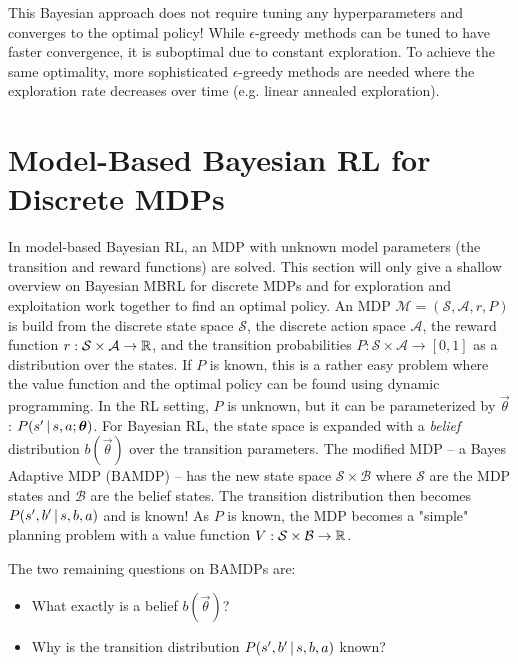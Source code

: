 			This Bayesian approach does not require tuning any hyperparameters and converges to the optimal policy! While \(\epsilon\)-greedy methods can be tuned to have faster convergence, it is suboptimal due to constant exploration. To achieve the same optimality, more sophisticated \(\epsilon\)-greedy methods are needed where the exploration rate decreases over time (e.g. linear annealed exploration).

	\section{Model-Based Bayesian RL for Discrete MDPs}
		In model-based Bayesian RL, an MDP with unknown model parameters (the transition and reward functions) are solved. This section will only give a shallow overview on Bayesian MBRL for discrete MDPs and for exploration and exploitation work together to find an optimal policy. An MDP \( \mathcal{M} = (\mathcal{S}, \mathcal{A}, r, P) \) is build from the discrete state space \(\mathcal{S}\), the discrete action space \(\mathcal{A}\), the reward function \( r : \mathcal{S} \times \mathcal{A} \to \mathbb{R} \), and the transition probabilities \( P : \mathcal{S} \times \mathcal{A} \to [0, 1] \) as a distribution over the states. If \(P\) is known, this is a rather easy problem where the value function and the optimal policy can be found using dynamic programming. In the RL setting, \(P\) is unknown, but it can be parameterized by \(\vec{\theta}\): \( P(s' \,\vert\, s, a; \bm{\theta}) \). For Bayesian RL, the state space is expanded with a \emph{belief} distribution \( b(\vec{\theta}) \) over the transition parameters. The modified MDP -- a Bayes Adaptive MDP (BAMDP) -- has the new state space \( \mathcal{S} \times \mathcal{B} \) where \(\mathcal{S}\) are the MDP states and \(\mathcal{B}\) are the belief states. The transition distribution then becomes \( P(s', b' \,\vert\, s, b, a) \) and is known! As \(P\) is known, the MDP becomes a "simple" planning problem with a value function \( V : \mathcal{S} \times \mathcal{B} \to \mathbb{R} \).

		The two remaining questions on BAMDPs are:
		\begin{itemize}
			\item What exactly is a belief \(b(\vec{\theta})\)?
			\item Why is the transition distribution \(P(s', b' \,\vert\, s, b, a)\) known?
		\end{itemize}


